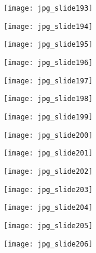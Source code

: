 \documentclass[main.tex]{subfiles}
\begin{document}
\begin{center}
\texttt{[image: jpg\_slide193]}
\end{center}

\begin{center}
\texttt{[image: jpg\_slide194]}
\end{center}

\begin{center}
\texttt{[image: jpg\_slide195]}
\end{center}

\begin{center}
\texttt{[image: jpg\_slide196]}
\end{center}

\begin{center}
\texttt{[image: jpg\_slide197]}
\end{center}

\begin{center}
\texttt{[image: jpg\_slide198]}
\end{center}

\begin{center}
\texttt{[image: jpg\_slide199]}
\end{center}

\begin{center}
\texttt{[image: jpg\_slide200]}
\end{center}

\begin{center}
\texttt{[image: jpg\_slide201]}
\end{center}

\begin{center}
\texttt{[image: jpg\_slide202]}
\end{center}

\begin{center}
\texttt{[image: jpg\_slide203]}
\end{center}

\begin{center}
\texttt{[image: jpg\_slide204]}
\end{center}

\begin{center}
\texttt{[image: jpg\_slide205]}
\end{center}

\begin{center}
\texttt{[image: jpg\_slide206]}
\end{center}
\end{document}
